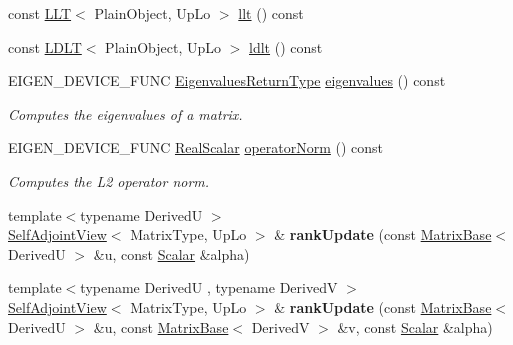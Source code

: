 \begin{DoxyCompactItemize}
\item 
const \mbox{\hyperlink{class_eigen_1_1_l_l_t}{L\+LT}}$<$ Plain\+Object, Up\+Lo $>$ \mbox{\hyperlink{class_eigen_1_1_self_adjoint_view_a405e810491642a7f7b785f2ad6f93619}{llt}} () const
\item 
const \mbox{\hyperlink{class_eigen_1_1_l_d_l_t}{L\+D\+LT}}$<$ Plain\+Object, Up\+Lo $>$ \mbox{\hyperlink{class_eigen_1_1_self_adjoint_view_a644155eef17b37c95d85b9f65bb49ac4}{ldlt}} () const
\item 
E\+I\+G\+E\+N\+\_\+\+D\+E\+V\+I\+C\+E\+\_\+\+F\+U\+NC \mbox{\hyperlink{class_eigen_1_1_self_adjoint_view_a8ae92703d920130b38a383f8b165146c}{Eigenvalues\+Return\+Type}} \mbox{\hyperlink{class_eigen_1_1_self_adjoint_view_ad4f34424b4ea12de9bbc5623cb938b4f}{eigenvalues}} () const
\begin{DoxyCompactList}\small\item\em Computes the eigenvalues of a matrix. \end{DoxyCompactList}\item 
E\+I\+G\+E\+N\+\_\+\+D\+E\+V\+I\+C\+E\+\_\+\+F\+U\+NC \mbox{\hyperlink{class_eigen_1_1_self_adjoint_view_af9f0234ebeae4c4ca512bcd5fb5e8bb1}{Real\+Scalar}} \mbox{\hyperlink{class_eigen_1_1_self_adjoint_view_a12a7da482e31ec9c517dca92dd7bae61}{operator\+Norm}} () const
\begin{DoxyCompactList}\small\item\em Computes the L2 operator norm. \end{DoxyCompactList}\item 
\mbox{\label{class_eigen_1_1_self_adjoint_view_aa63a7382c7ee17c2aee7eb7423cdf4c8}} 
{\footnotesize template$<$typename DerivedU $>$ }\\\mbox{\hyperlink{class_eigen_1_1_self_adjoint_view}{Self\+Adjoint\+View}}$<$ Matrix\+Type, Up\+Lo $>$ \& {\bfseries rank\+Update} (const \mbox{\hyperlink{class_eigen_1_1_matrix_base}{Matrix\+Base}}$<$ DerivedU $>$ \&u, const \mbox{\hyperlink{class_eigen_1_1_self_adjoint_view_af52acc0942ece2de9b6db4a99cc6656e}{Scalar}} \&alpha)
\item 
\mbox{\label{class_eigen_1_1_self_adjoint_view_a650325c31cbae96d040ab0f95e21dba7}} 
{\footnotesize template$<$typename DerivedU , typename DerivedV $>$ }\\\mbox{\hyperlink{class_eigen_1_1_self_adjoint_view}{Self\+Adjoint\+View}}$<$ Matrix\+Type, Up\+Lo $>$ \& {\bfseries rank\+Update} (const \mbox{\hyperlink{class_eigen_1_1_matrix_base}{Matrix\+Base}}$<$ DerivedU $>$ \&u, const \mbox{\hyperlink{class_eigen_1_1_matrix_base}{Matrix\+Base}}$<$ DerivedV $>$ \&v, const \mbox{\hyperlink{class_eigen_1_1_self_adjoint_view_af52acc0942ece2de9b6db4a99cc6656e}{Scalar}} \&alpha)
\end{DoxyCompactItemize}
